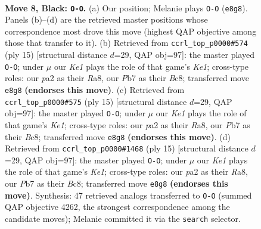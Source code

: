 \documentclass[11pt]{article}
\begin{document}
\begin{figure}[p]\centering
\begin{subfigure}{0.46\textwidth}\centering
\resizebox{\linewidth}{!}{%
\newchessgame
\chessboard[
  setfen={r1bqk2r/ppp1bppp/1nn5/4p3/4P2P/2N2NP1/PP1P1PB1/R1BQK2R b KQkq - 0 8},
  showmover=false,
  pgfstyle=straightmove, color=movearrow, markmove={e8-g8}
]}
\caption{}
\end{subfigure}\hfill
\begin{subfigure}{0.46\textwidth}\centering
\resizebox{\linewidth}{!}{%
\newchessgame
\chessboard[
  setfen={r1bqk2r/ppp1bppp/1nn5/4p3/8/P1N2NP1/1P1PPPBP/R1BQ1RK1 b kq - 0 8},
  showmover=false,
  pgfstyle=straightmove, color=movearrow, markmove={e8-g8}
]}
\caption{}
\end{subfigure}
\\[4pt]
\begin{subfigure}{0.46\textwidth}\centering
\resizebox{\linewidth}{!}{%
\newchessgame
\chessboard[
  setfen={r1bqk2r/ppp1bppp/1nn5/4p3/8/P1N2NP1/1P1PPPBP/R1BQ1RK1 b kq - 0 8},
  showmover=false,
  pgfstyle=straightmove, color=movearrow, markmove={e8-g8}
]}
\caption{}
\end{subfigure}\hfill
\begin{subfigure}{0.46\textwidth}\centering
\resizebox{\linewidth}{!}{%
\newchessgame
\chessboard[
  setfen={r1bqk2r/ppp1bppp/1nn5/4p3/8/P1N2NP1/1P1PPPBP/R1BQ1RK1 b kq - 0 8},
  showmover=false,
  pgfstyle=straightmove, color=movearrow, markmove={e8-g8}
]}
\caption{}
\end{subfigure}
\caption{\textbf{Move 8, Black: \texttt{O-O}.} (a) Our position; Melanie plays \texttt{O-O} (\texttt{e8g8}). Panels (b)--(d) are the retrieved master positions whose correspondence most drove this move (highest QAP objective among those that transfer to it). (b) Retrieved from \texttt{ccrl\_top\_p0000\#574} (ply 15) [structural distance $d$=29, QAP obj=97]: the master played \texttt{O-O}; under $\mu$ our \emph{Ke1} plays the role of that game's \emph{Ke1}; cross-type roles: our \emph{p}a2 as their \emph{R}a8, our \emph{P}b7 as their \emph{B}c8; transferred move \texttt{e8g8} \textbf{(endorses this move)}. (c) Retrieved from \texttt{ccrl\_top\_p0000\#575} (ply 15) [structural distance $d$=29, QAP obj=97]: the master played \texttt{O-O}; under $\mu$ our \emph{Ke1} plays the role of that game's \emph{Ke1}; cross-type roles: our \emph{p}a2 as their \emph{R}a8, our \emph{P}b7 as their \emph{B}c8; transferred move \texttt{e8g8} \textbf{(endorses this move)}. (d) Retrieved from \texttt{ccrl\_top\_p0000\#1468} (ply 15) [structural distance $d$=29, QAP obj=97]: the master played \texttt{O-O}; under $\mu$ our \emph{Ke1} plays the role of that game's \emph{Ke1}; cross-type roles: our \emph{p}a2 as their \emph{R}a8, our \emph{P}b7 as their \emph{B}c8; transferred move \texttt{e8g8} \textbf{(endorses this move)}. Synthesis: 47 retrieved analogs transferred to \texttt{O-O} (summed QAP objective 4262, the strongest correspondence among the candidate moves); Melanie committed it via the \texttt{search} selector.}
\label{fig:thought-m15}
\end{figure}
\end{document}
